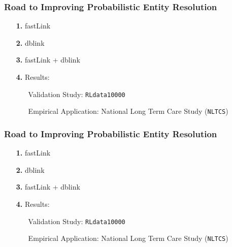 \documentclass[9pt]{beamer}
\begin{document}

\begin{frame}[plain]
\frametitle{Road to Improving Probabilistic Entity Resolution}

\begin{itemize}
\item[{\color{orange} \bf 1.}] fastLink
\vfill
\item[{\color{orange} \bf 2.}] dblink 
\vfill
\item[{\color{orange} \bf 3.}] fastLink + dblink 
\vfill
\item[{\color{orange} \bf 4.}] Results: 
\vfill
\begin{itemize}
\item[\TedB] Validation Study: \texttt{RLdata10000}  \vfill
\item[\TedB] Empirical Application: National Long Term Care Study (\texttt{NLTCS})
\end{itemize}
\vfill
\end{itemize}
\end{frame}

\begin{frame}[plain]
\frametitle{Road to Improving Probabilistic Entity Resolution}

\begin{itemize}
\item[{\color{orange} \bf 1.}] fastLink
\vfill
\item[{\color{orange!30} \bf 2.}] {\color{black!30} dblink }
\vfill
\item[{\color{orange!30} \bf 3.}] {\color{black!30} fastLink + dblink }
\vfill
\item[{\color{orange!30} \bf 4.}] {\color{black!30} Results: }
\vfill
\begin{itemize}
\item[\TedBB] {\color{black!30} Validation Study: \texttt{RLdata10000} } \vfill
\item[\TedBB] {\color{black!30} Empirical Application: National Long Term Care Study (\texttt{NLTCS})}
\end{itemize}
\vfill
\end{itemize}
\end{frame}

\addtocounter{framenumber}{-2}
\end{document}
